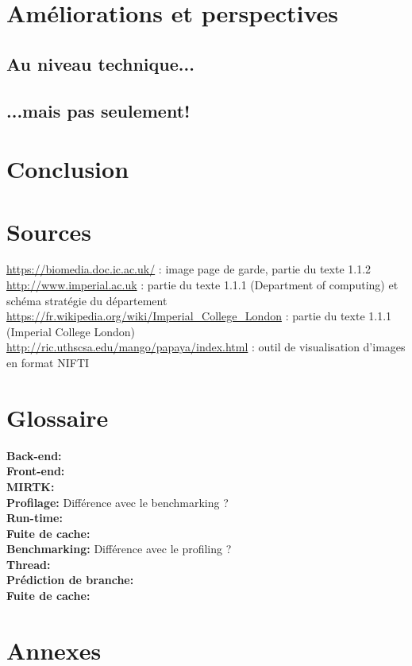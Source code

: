 \documentclass[10pt]{report}
\begin{document}
\chapter{Améliorations et perspectives}
	\section{Au niveau technique...}
	\section{...mais pas seulement!}

\chapter*{Conclusion} %
\chapter*{Sources}
\noindent
\url{https://biomedia.doc.ic.ac.uk/}  : image page de garde, partie du texte 1.1.2 \\
\url{http://www.imperial.ac.uk} : partie du texte 1.1.1 (Department of computing) et schéma stratégie du département\\
\url{https://fr.wikipedia.org/wiki/Imperial_College_London} : partie du texte 1.1.1 (Imperial College London)\\
\url{http://ric.uthscsa.edu/mango/papaya/index.html} : outil de visualisation d'images en format NIFTI
\renewcommand{\listfigurename}{Table des illustations}
\listoffigures
{}
\chapter*{Glossaire}
\noindent
\textbf{Back-end:}\\ 
\textbf{Front-end:}\\
\textbf{MIRTK:}\\
\textbf{Profilage:} Différence avec le benchmarking ?\\
\textbf{Run-time:}\\
\textbf{Fuite de cache:}\\
\textbf{Benchmarking:} Différence avec le profiling ?\\
\textbf{Thread:}\\
\textbf{Prédiction de branche:}\\
\textbf{Fuite de cache:}\\


\chapter*{Annexes}
\end{document}
